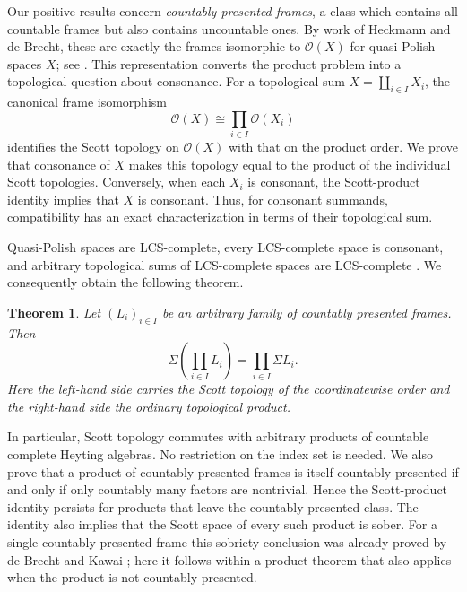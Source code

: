 \documentclass[11pt,reqno]{amsart}
\newtheorem{theorem}{Theorem}[section]
\theoremstyle{definition}
\numberwithin{equation}{section}
\newcommand{\OO}{\mathcal O}
\begin{document}
Our positive results concern \emph{countably presented frames}, a class
which contains all countable frames but also contains uncountable ones.
By work of Heckmann and de Brecht, these are exactly the frames isomorphic
to $\OO(X)$ for quasi-Polish spaces $X$; see
\citep{Heckmann2015,deBrecht2013,deBrechtKawai2019}. This representation
converts the product problem into a topological question about consonance.
For a topological sum $X=\coprod_{i\in I}X_i$, the canonical frame
isomorphism
\[
  \OO(X)\cong\prod_{i\in I}\OO(X_i)
\]
identifies the Scott topology on $\OO(X)$ with that on the product order.
We prove that consonance of $X$ makes this topology equal to the product
of the individual Scott topologies. Conversely, when each $X_i$ is
consonant, the Scott-product identity implies that $X$ is consonant.
Thus, for consonant summands, compatibility has an exact characterization
in terms of their topological sum.

Quasi-Polish spaces are LCS-complete, every LCS-complete space is consonant,
and arbitrary topological sums of LCS-complete spaces are LCS-complete
\citep{deBrechtEtAl2019}. We consequently obtain the following theorem.

\begin{theorem}\label{thm:main-intro}
Let $(L_i)_{i\in I}$ be an arbitrary family of countably presented frames.
Then
\[
  \Sigma\!\left(\prod_{i\in I}L_i\right)
  =\prod_{i\in I}\Sigma L_i.
\]
Here the left-hand side carries the Scott topology of the coordinatewise
order and the right-hand side the ordinary topological product.
\end{theorem}

In particular, Scott topology commutes with arbitrary products of
countable complete Heyting algebras. No restriction on the index set is
needed. We also prove that a product of countably presented frames is
itself countably presented if and only if only countably many factors are
nontrivial. Hence the Scott-product identity persists for products that
leave the countably presented class. The identity also implies that the
Scott space of every such product is sober. For a single countably
presented frame this sobriety conclusion was already proved by de Brecht
and Kawai \citep[Corollary~8.6]{deBrechtKawai2019}; here it follows within
a product theorem that also applies when the product is not countably
presented.
\end{document}
